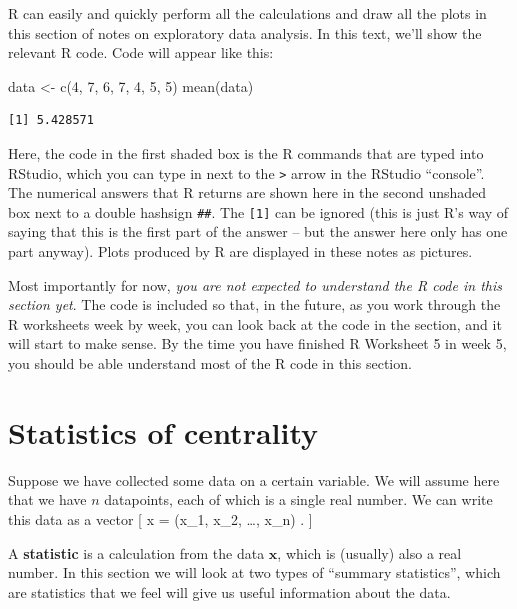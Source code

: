 \documentclass[
  letterpaper,
]{report}
\newenvironment{Shaded}{\begin{snugshade}}{\end{snugshade}}
\newcommand{\DecValTok}[1]{\textcolor[rgb]{0.68,0.00,0.00}{#1}}
\newcommand{\FunctionTok}[1]{\textcolor[rgb]{0.28,0.35,0.67}{#1}}
\newcommand{\NormalTok}[1]{\textcolor[rgb]{0.00,0.23,0.31}{#1}}
\newcommand{\OtherTok}[1]{\textcolor[rgb]{0.00,0.23,0.31}{#1}}
\theoremstyle{definition}
\theoremstyle{definition}
\theoremstyle{remark}
\begin{document}
R can easily and quickly perform all the calculations and draw all the
plots in this section of notes on exploratory data analysis. In this
text, we'll show the relevant R code. Code will appear like this:

\begin{Shaded}
\begin{Highlighting}[]
\NormalTok{data }\OtherTok{\textless{}{-}} \FunctionTok{c}\NormalTok{(}\DecValTok{4}\NormalTok{, }\DecValTok{7}\NormalTok{, }\DecValTok{6}\NormalTok{, }\DecValTok{7}\NormalTok{, }\DecValTok{4}\NormalTok{, }\DecValTok{5}\NormalTok{, }\DecValTok{5}\NormalTok{)}
\FunctionTok{mean}\NormalTok{(data)}
\end{Highlighting}
\end{Shaded}

\begin{verbatim}
[1] 5.428571
\end{verbatim}

Here, the code in the first shaded box is the R commands that are typed
into RStudio, which you can type in next to the \texttt{\textgreater{}}
arrow in the RStudio ``console''. The numerical answers that R returns
are shown here in the second unshaded box next to a double hashsign
\texttt{\#\#}. The \texttt{{[}1{]}} can be ignored (this is just R's way
of saying that this is the first part of the answer -- but the answer
here only has one part anyway). Plots produced by R are displayed in
these notes as pictures.

Most importantly for now, \emph{you are not expected to understand the R
code in this section yet}. The code is included so that, in the future,
as you work through the R worksheets week by week, you can look back at
the code in the section, and it will start to make sense. By the time
you have finished R Worksheet 5 in week 5, you should be able understand
most of the R code in this section.

\hypertarget{stat-central}{%
\section{Statistics of centrality}\label{stat-central}}

Suppose we have collected some data on a certain variable. We will
assume here that we have \(n\) datapoints, each of which is a single
real number. We can write this data as a vector {[} \mathbf x = (x\_1,
x\_2, \dots, x\_n) . {]}

A \textbf{statistic} is a calculation from the data \(\mathbf x\), which
is (usually) also a real number. In this section we will look at two
types of ``summary statistics'', which are statistics that we feel will
give us useful information about the data.
\end{document}
